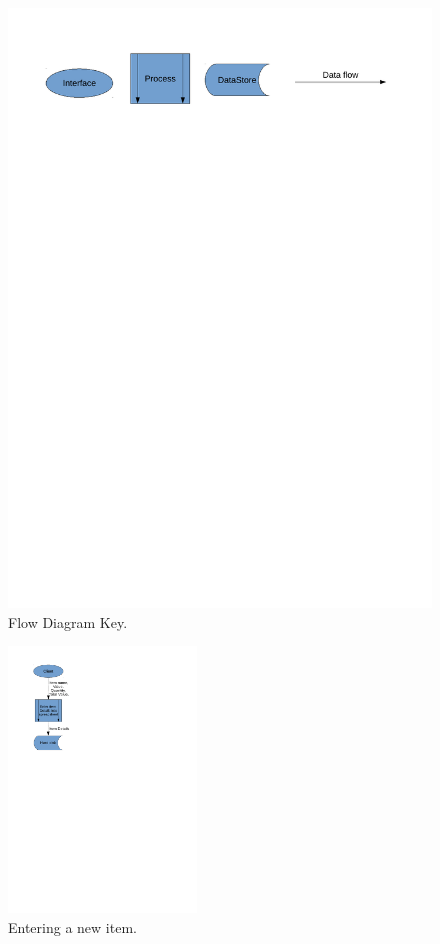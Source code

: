 \documentclass[12pt]{report}
\begin{document}
\begin{figure}[H]
    \caption{Flow Diagram Key.} \label{fig:print_function_result}
    \includegraphics[width=\textwidth]{./DFD_analysis_key.pdf}
\end{figure}

\begin{figure}[H]
    \caption{Entering a new item.} \label{fig:print_function_result}
    \includegraphics[width=50mm,scale=0.5]{./DFD_analysis_new_item.pdf}
\end{figure}
\end{document}
